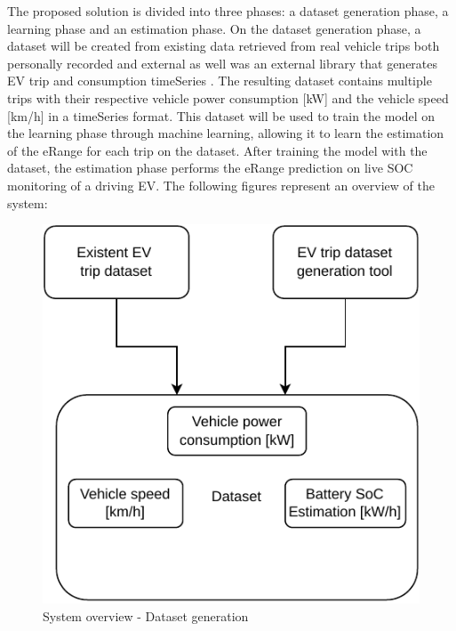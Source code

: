 The proposed solution is divided into three phases: 
a \gls{dataset} generation phase, a learning phase
and an estimation phase.
On the \gls{dataset} generation phase, a \gls{dataset}
will be created from existing data retrieved from
real vehicle trips both personally recorded and 
external \citep{vedDataset} 
as well was an external library that generates 
\gls{EV} trip and consumption \gls{timeSeries} \citep{emobpy}.
The resulting dataset contains multiple
trips with their respective vehicle power consumption [kW]
and the vehicle speed [km/h] in a  \gls{timeSeries} format.
This \gls{dataset} will be used to train the model
on the learning phase through machine learning, 
allowing it to learn the estimation of 
the \gls{eRange} for each trip on the \gls{dataset}.
After training the model with the dataset,
the estimation phase performs the \gls{eRange} prediction
on live \gls{SOC} monitoring of a driving \gls{EV}.
The following figures represent an overview of the system:


\begin{figure}[H]
    \begin{center}
        \includegraphics[scale=1.0]{../figures/generic_diagram_dataset_generation_phase}
        \caption{System overview - Dataset generation}
    \end{center}
\end{figure}

